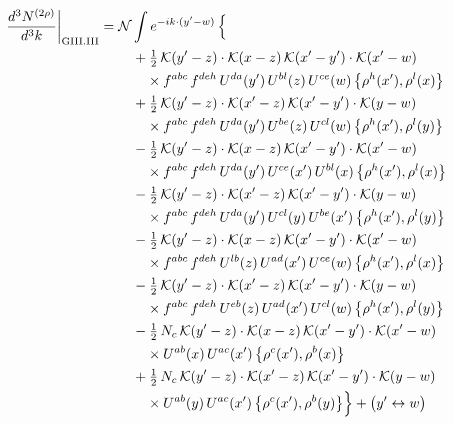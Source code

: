 \documentclass[10pt]{article}
\numberwithin{equation}{section}
\newcommand{\KK}{\mathcal K}
\newcommand{\NN}{\mathcal N}
\begin{document}
\begin{align}
\frac{d^3N^{(2\rho)}}{d^3k}\bigg|_{\rm GIII.III}={}&\NN\int e^{-ik\cdot(y'-w)}\,\Big\{\notag\\
&\quad +\tfrac12\,\KK(y'-z)\cdot\KK(x-z)\,\KK(x'-y')\cdot\KK(x'-w)\notag\\
&\qquad\times f^{abc}\,f^{deh}\,U^{da}(y')\,U^{bl}(z)\,U^{ce}(w)\,\big\{\rho^{h}(x'),\rho^{l}(x)\big\}\notag\\
&\quad +\tfrac12\,\KK(y'-z)\cdot\KK(x'-z)\,\KK(x'-y')\cdot\KK(y-w)\notag\\
&\qquad\times f^{abc}\,f^{deh}\,U^{da}(y')\,U^{be}(z)\,U^{cl}(w)\,\big\{\rho^{h}(x'),\rho^{l}(y)\big\}\notag\\
&\quad -\tfrac12\,\KK(y'-z)\cdot\KK(x-z)\,\KK(x'-y')\cdot\KK(x'-w)\notag\\
&\qquad\times f^{abc}\,f^{deh}\,U^{da}(y')\,U^{ce}(x')\,U^{bl}(x)\,\big\{\rho^{h}(x'),\rho^{l}(x)\big\}\notag\\
&\quad -\tfrac12\,\KK(y'-z)\cdot\KK(x'-z)\,\KK(x'-y')\cdot\KK(y-w)\notag\\
&\qquad\times f^{abc}\,f^{deh}\,U^{da}(y')\,U^{cl}(y)\,U^{be}(x')\,\big\{\rho^{h}(x'),\rho^{l}(y)\big\}\notag\\
&\quad -\tfrac12\,\KK(y'-z)\cdot\KK(x-z)\,\KK(x'-y')\cdot\KK(x'-w)\notag\\
&\qquad\times f^{abc}\,f^{deh}\,U^{lb}(z)\,U^{ad}(x')\,U^{ce}(w)\,\big\{\rho^{h}(x'),\rho^{l}(x)\big\}\notag\\
&\quad -\tfrac12\,\KK(y'-z)\cdot\KK(x'-z)\,\KK(x'-y')\cdot\KK(y-w)\notag\\
&\qquad\times f^{abc}\,f^{deh}\,U^{eb}(z)\,U^{ad}(x')\,U^{cl}(w)\,\big\{\rho^{h}(x'),\rho^{l}(y)\big\}\notag\\
&\quad -\tfrac12\,N_{c}\,\KK(y'-z)\cdot\KK(x-z)\,\KK(x'-y')\cdot\KK(x'-w)\notag\\
&\qquad\times U^{ab}(x)\,U^{ac}(x')\,\big\{\rho^{c}(x'),\rho^{b}(x)\big\}\notag\\
&\quad +\tfrac12\,N_{c}\,\KK(y'-z)\cdot\KK(x'-z)\,\KK(x'-y')\cdot\KK(y-w)\notag\\
&\qquad\times U^{ab}(y)\,U^{ac}(x')\,\big\{\rho^{c}(x'),\rho^{b}(y)\big\}\Big\}+\big(y'\leftrightarrow w\big)\label{eq:sum-GIII.III}
\end{align}
\end{document}
